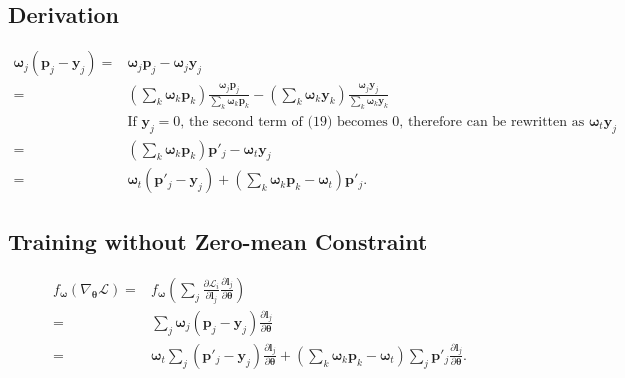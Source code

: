 \subsection{Derivation}
\label{subsection: Appendix_B.1}
\begin{align}
    \label{eq: ana}
    \boldsymbol{\omega}_j(\boldsymbol{p}_j-\mathbf{y}_j) =& \boldsymbol{\omega}_j\boldsymbol{p}_j-\boldsymbol{\omega}_j\mathbf{y}_j\\
    =& \left(\sum_k \boldsymbol{\omega}_k\boldsymbol{p}_k\right)\frac{\boldsymbol{\omega}_j\boldsymbol{p}_j}{\sum_k \boldsymbol{\omega}_k\boldsymbol{p}_k}-\left(\sum_k \boldsymbol{\omega}_k\mathbf{y}_k\right)\frac{\boldsymbol{\omega}_j\mathbf{y}_j}{\sum_k \boldsymbol{\omega}_k\mathbf{y}_k}\\
    &\text{If $\mathbf{y}_j = 0$, the second term of (19) becomes $0$, therefore can be rewritten as $\boldsymbol{\omega}_t\mathbf{y}_j$} \nonumber\\ 
    =& \left(\sum_k \boldsymbol{\omega}_k\boldsymbol{p}_k\right){\boldsymbol{p}'_j}-\boldsymbol{\omega}_t\mathbf{y}_j\\
    =& \boldsymbol{\omega}_t\left({\boldsymbol{p}'_j} - {\mathbf{y}_j}\right) + \left(\sum_k{{\boldsymbol{\omega}_k} {\boldsymbol{p}_k}}-\boldsymbol{\omega}_t\right){\boldsymbol{p}'_j}.\label{app:eq:grad1'}
\end{align}

\subsection{Training without Zero-mean Constraint}
\label{subsection: Appendix_B.2}
\begin{equation} \label{app:eq2}
\begin{split}
f_{\boldsymbol \omega}\left(\nabla_{\boldsymbol \theta} \mathcal{L}\right) =& f_{\boldsymbol \omega}(\sum_j\frac{\partial \mathcal{L}_i}{\partial \boldsymbol{l}_j} \frac{\partial \boldsymbol{l}_j}{\partial \boldsymbol \theta}) \\
    =& \sum_j \boldsymbol{\omega}_j(\boldsymbol{p}_j-\mathbf{y}_j)\frac{\partial \boldsymbol{l}_j}{\partial \boldsymbol \theta} \\
    =& \boldsymbol{\omega}_{t} \sum_j({\boldsymbol{p}'_j}-\mathbf{y}_j)\frac{\partial \boldsymbol{l}_j}{\partial \boldsymbol \theta} + (\sum_k{{\boldsymbol \omega_k} {\boldsymbol{p}_k}}-\boldsymbol{\omega}_{t}) \sum_j {\boldsymbol{p}'_j}\frac{\partial \boldsymbol{l}_j}{\partial \boldsymbol \theta}.
\end{split}
\end{equation}




